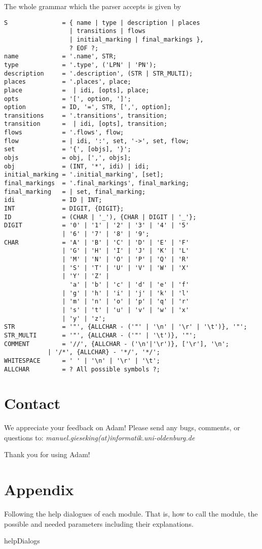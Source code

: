 \documentclass[runningheads]{./llncs/llncs}
\newcommand{\tool}{{\sc Adam}}
\begin{document}
The whole grammar which the parser accepts is given by 
\begin{lstlisting}[captionpos=b, caption=Grammar of the APT format for labelled Petri nets, label = lst:grammar,language=ebnf]
S               = { name | type | description | places 
                  | transitions | flows 
                  | initial_marking | final_markings },
                  ? EOF ?;
name            = '.name', STR;
type            = '.type', ('LPN' | 'PN');
description     = '.description', (STR | STR_MULTI);
places          = '.places', place;
place           =  | idi, [opts], place;
opts            = '[', option, ']';
option          = ID, '=', STR, [',', option];
transitions     = '.transitions', transition;
transition      =  | idi, [opts], transition;
flows           = '.flows', flow;
flow            = | idi, ':', set, '->', set, flow;
set             = '{', [objs], '}';
objs            = obj, [',', objs]; 
obj             = (INT, '*', idi) | idi;
initial_marking = '.initial_marking', [set];
final_markings  = '.final_markings', final_marking;
final_marking   = | set, final_marking;
idi             = ID | INT;
INT             = DIGIT, {DIGIT};
ID              = (CHAR | '_'), {CHAR | DIGIT | '_'};
DIGIT           = '0' | '1' | '2' | '3' | '4' | '5' 
                | '6' | '7' | '8' | '9';
CHAR            = 'A' | 'B' | 'C' | 'D' | 'E' | 'F'
                | 'G' | 'H' | 'I' | 'J' | 'K' | 'L'
                | 'M' | 'N' | 'O' | 'P' | 'Q' | 'R'
                | 'S' | 'T' | 'U' | 'V' | 'W' | 'X'
                | 'Y' | 'Z' |
                  'a' | 'b' | 'c' | 'd' | 'e' | 'f'
                | 'g' | 'h' | 'i' | 'j' | 'k' | 'l'
                | 'm' | 'n' | 'o' | 'p' | 'q' | 'r'
                | 's' | 't' | 'u' | 'v' | 'w' | 'x'
                | 'y' | 'z';
STR             = '"', {ALLCHAR - ('"' | '\n' | '\r' | '\t')}, '"';
STR_MULTI       = '"', {ALLCHAR - ('"' | '\t')}, '"';
COMMENT         = '//', {ALLCHAR - ('\n'|'\r')}, ['\r'], '\n';
	        | '/*', {ALLCHAR} - '*/', '*/';
WHITESPACE      = ' ' | '\n' | '\r' | '\t';
ALLCHAR         = ? All possible symbols ?;
\end{lstlisting}


\section{Contact}
We appreciate your feedback on \tool{}! Please send any bugs, comments, or questions to: \emph{manuel.gieseking(at)informatik.uni-oldenburg.de}

Thank you for using \tool{}!

\appendix
\section{Appendix}
\label{sec:appendix}
Following the help dialogues of each module. That is, how to call the module, the possible 
and needed parameters including their explanations.
\begin{subappendices}
{helpDialogs}
\end{subappendices}
\end{document}
